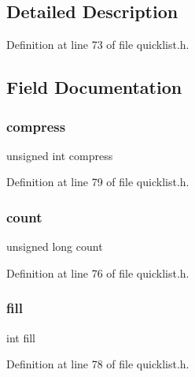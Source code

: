 \subsection{Detailed Description}


Definition at line 73 of file quicklist.\+h.



\subsection{Field Documentation}
\mbox{\label{structquicklist_a851a2a518700a4f5aa3d8e099978afca}} 
\subsubsection{\texorpdfstring{compress}{compress}}
{\footnotesize\ttfamily unsigned int compress}



Definition at line 79 of file quicklist.\+h.

\mbox{\label{structquicklist_a61b4b8d2ac3f4853727e2c2fcbec3503}} 
\subsubsection{\texorpdfstring{count}{count}}
{\footnotesize\ttfamily unsigned long count}



Definition at line 76 of file quicklist.\+h.

\mbox{\label{structquicklist_a1bddf1e646fa3d6b3553e28e41cfe7c5}} 
\subsubsection{\texorpdfstring{fill}{fill}}
{\footnotesize\ttfamily int fill}



Definition at line 78 of file quicklist.\+h.

\mbox{\label{structquicklist_a9768476640799c4dc25850d7dfb5f436}} 
